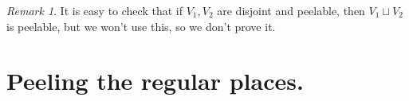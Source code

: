 \documentclass[openany]{amsbook}
\theoremstyle{definition}
\theoremstyle{remark}
\newtheorem{remark}[theorem]{Remark}
\numberwithin{equation}{section}
\renewcommand{\-}{\operatorname{-}}
\begin{document}


\begin{remark}\label{rmk.peelable.union}
    It is easy to check that if $V_1, V_2$ are disjoint and peelable, then $V_1 \sqcup V_2$ is peelable, but we won't use this, so we don't prove it. 
\end{remark}











\section{Peeling the regular places.}\label{subsect.peel.regular}
\end{document}
